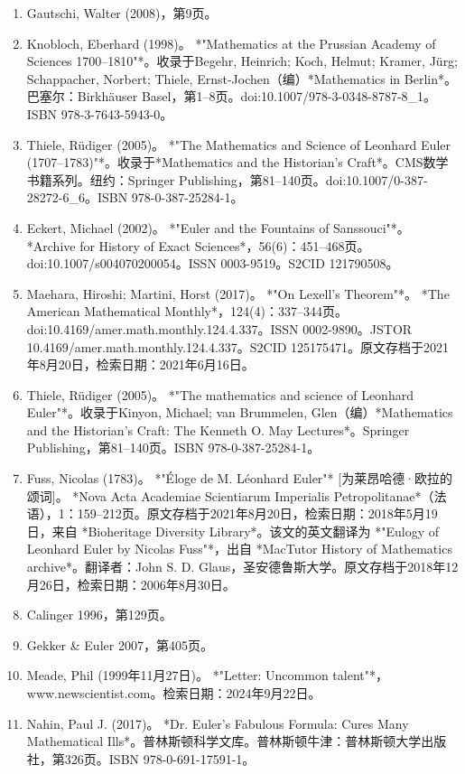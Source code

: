 \begin{enumerate}
\item Gautschi, Walter (2008)，第9页。
\item Knobloch, Eberhard (1998)。 *"Mathematics at the Prussian Academy of Sciences 1700–1810"*。收录于Begehr, Heinrich; Koch, Helmut; Kramer, Jürg; Schappacher, Norbert; Thiele, Ernst-Jochen（编）*Mathematics in Berlin*。巴塞尔：Birkhäuser Basel，第1–8页。doi:10.1007/978-3-0348-8787-8_1。ISBN 978-3-7643-5943-0。
\item Thiele, Rüdiger (2005)。 *"The Mathematics and Science of Leonhard Euler (1707–1783)"*。收录于*Mathematics and the Historian's Craft*。CMS数学书籍系列。纽约：Springer Publishing，第81–140页。doi:10.1007/0-387-28272-6_6。ISBN 978-0-387-25284-1。
\item Eckert, Michael (2002)。 *"Euler and the Fountains of Sanssouci"*。 *Archive for History of Exact Sciences*，56(6)：451–468页。doi:10.1007/s004070200054。ISSN 0003-9519。S2CID 121790508。
\item Maehara, Hiroshi; Martini, Horst (2017)。 *"On Lexell's Theorem"*。 *The American Mathematical Monthly*，124(4)：337–344页。doi:10.4169/amer.math.monthly.124.4.337。ISSN 0002-9890。JSTOR 10.4169/amer.math.monthly.124.4.337。S2CID 125175471。原文存档于2021年8月20日，检索日期：2021年6月16日。
\item Thiele, Rüdiger (2005)。 *"The mathematics and science of Leonhard Euler"*。收录于Kinyon, Michael; van Brummelen, Glen（编）*Mathematics and the Historian's Craft: The Kenneth O. May Lectures*。Springer Publishing，第81–140页。ISBN 978-0-387-25284-1。
\item Fuss, Nicolas (1783)。 *"Éloge de M. Léonhard Euler"* [为莱昂哈德·欧拉的颂词]。 *Nova Acta Academiae Scientiarum Imperialis Petropolitanae*（法语），1：159–212页。原文存档于2021年8月20日，检索日期：2018年5月19日，来自 *Bioheritage Diversity Library*。该文的英文翻译为 *"Eulogy of Leonhard Euler by Nicolas Fuss"*，出自 *MacTutor History of Mathematics archive*。翻译者：John S. D. Glaus，圣安德鲁斯大学。原文存档于2018年12月26日，检索日期：2006年8月30日。
\item Calinger 1996，第129页。
\item Gekker & Euler 2007，第405页。
\item Meade, Phil (1999年11月27日)。 *"Letter: Uncommon talent"*，www.newscientist.com。检索日期：2024年9月22日。
\item Nahin, Paul J. (2017)。 *Dr. Euler's Fabulous Formula: Cures Many Mathematical Ills*。普林斯顿科学文库。普林斯顿牛津：普林斯顿大学出版社，第326页。ISBN 978-0-691-17591-1。

\end{enumerate}
